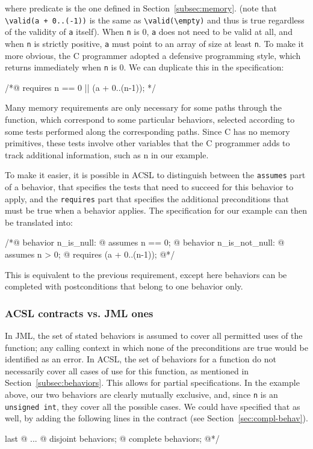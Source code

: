 where predicate \valid is the one defined in Section~\ref{subsec:memory}.
(note that \lstinline|\valid(a + 0..(-1))| is the same as
\lstinline|\valid(\empty)| and thus is true regardless of the validity of
\lstinline|a| itself).
When \lstinline|n| is 0, \lstinline|a| does
not need to be valid at all, and when \lstinline|n| is strictly
positive, \lstinline|a| must point to an array of size at least
\lstinline|n|. To make it more obvious, the C programmer adopted a
defensive programming style, which returns immediately when \lstinline|n| is
0. We can duplicate this in the specification:

\begin{listing-nonumber}
/*@ requires n == 0 || \valid(a + 0..(n-1)); */
\end{listing-nonumber}

Many memory requirements are only necessary for some paths
through the function, which correspond to some particular
behaviors, selected according to some tests performed along the
corresponding paths. Since C has no memory
primitives, these tests involve other variables that the C programmer
adds to track additional information, such as {\ttfamily n} in our example.

To make it easier, it is possible in ACSL to distinguish between the
\lstinline|assumes| part of a behavior, that specifies the tests that need
to succeed for this behavior to apply, and the \lstinline|requires| part
that specifies the additional preconditions that must be true when a
behavior applies. The specification for our example can then be
translated into:

\begin{listing}{1}
/*@ behavior n_is_null:
  @   assumes n == 0;
  @ behavior n_is_not_null:
  @   assumes n > 0;
  @   requires \valid(a + 0..(n-1));
  @*/
\end{listing}

This is equivalent to the previous requirement, except here behaviors
can be completed with postconditions that belong to one behavior only.

\subsubsection*{ACSL contracts vs. JML ones}

In JML, the set of stated behaviors is assumed to cover all
permitted uses of the function; any calling context in which none of the preconditions are true would be identified as an error.
In ACSL, the set of behaviors for a function do not
necessarily cover all cases of use for this function, as mentioned in
Section~\ref{subsec:behaviors}. This allows for partial
specifications. In the example above, our two behaviors are clearly mutually exclusive,
and, since \lstinline|n| is an \lstinline|unsigned int|, 
they cover all the possible cases. We could have specified that as well, by
adding the following lines in the contract (see
Section~\ref{sec:compl-behav}).
\begin{listing}{last}
  @ ...
  @ disjoint behaviors;
  @ complete behaviors;
  @*/
\end{listing}

